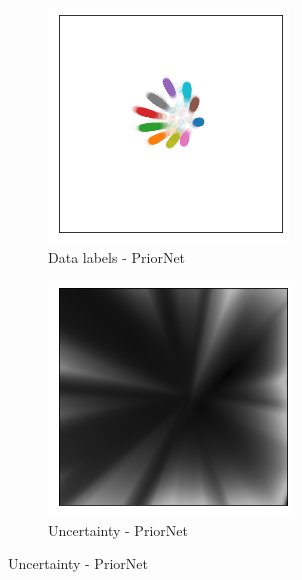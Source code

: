 \begin{figure}[ht!]
    \centering
    \begin{subfigure}[t]{0.23 \columnwidth}
        \centering
        \includegraphics[width=0.8 \textwidth]{sections/006_neurips2020/figures/2D_latent_klpn_2.png}
         \caption{Data labels - PriorNet}
         \label{KLPN_visualization_2D}
    \end{subfigure}%
    \begin{subfigure}[t]{0.23\columnwidth}
        \centering
        \includegraphics[width=0.8 \textwidth]{sections/006_neurips2020/figures/2D_latent_klpn_1.png}
        \caption{Uncertainty - PriorNet}
        \label{KLPN_visualization_unc}

\end{subfigure}
\end{figure}
